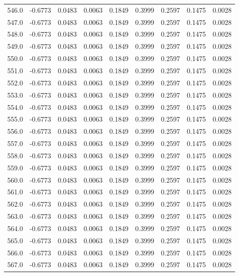 \begin{longtable}{lrrrrrrrr}
546.0 & -0.6773 & 0.0483 & 0.0063 & 0.1849 & 0.3999 & 0.2597 & 0.1475 & 0.0028 \\
547.0 & -0.6773 & 0.0483 & 0.0063 & 0.1849 & 0.3999 & 0.2597 & 0.1475 & 0.0028 \\
548.0 & -0.6773 & 0.0483 & 0.0063 & 0.1849 & 0.3999 & 0.2597 & 0.1475 & 0.0028 \\
549.0 & -0.6773 & 0.0483 & 0.0063 & 0.1849 & 0.3999 & 0.2597 & 0.1475 & 0.0028 \\
550.0 & -0.6773 & 0.0483 & 0.0063 & 0.1849 & 0.3999 & 0.2597 & 0.1475 & 0.0028 \\
551.0 & -0.6773 & 0.0483 & 0.0063 & 0.1849 & 0.3999 & 0.2597 & 0.1475 & 0.0028 \\
552.0 & -0.6773 & 0.0483 & 0.0063 & 0.1849 & 0.3999 & 0.2597 & 0.1475 & 0.0028 \\
553.0 & -0.6773 & 0.0483 & 0.0063 & 0.1849 & 0.3999 & 0.2597 & 0.1475 & 0.0028 \\
554.0 & -0.6773 & 0.0483 & 0.0063 & 0.1849 & 0.3999 & 0.2597 & 0.1475 & 0.0028 \\
555.0 & -0.6773 & 0.0483 & 0.0063 & 0.1849 & 0.3999 & 0.2597 & 0.1475 & 0.0028 \\
556.0 & -0.6773 & 0.0483 & 0.0063 & 0.1849 & 0.3999 & 0.2597 & 0.1475 & 0.0028 \\
557.0 & -0.6773 & 0.0483 & 0.0063 & 0.1849 & 0.3999 & 0.2597 & 0.1475 & 0.0028 \\
558.0 & -0.6773 & 0.0483 & 0.0063 & 0.1849 & 0.3999 & 0.2597 & 0.1475 & 0.0028 \\
559.0 & -0.6773 & 0.0483 & 0.0063 & 0.1849 & 0.3999 & 0.2597 & 0.1475 & 0.0028 \\
560.0 & -0.6773 & 0.0483 & 0.0063 & 0.1849 & 0.3999 & 0.2597 & 0.1475 & 0.0028 \\
561.0 & -0.6773 & 0.0483 & 0.0063 & 0.1849 & 0.3999 & 0.2597 & 0.1475 & 0.0028 \\
562.0 & -0.6773 & 0.0483 & 0.0063 & 0.1849 & 0.3999 & 0.2597 & 0.1475 & 0.0028 \\
563.0 & -0.6773 & 0.0483 & 0.0063 & 0.1849 & 0.3999 & 0.2597 & 0.1475 & 0.0028 \\
564.0 & -0.6773 & 0.0483 & 0.0063 & 0.1849 & 0.3999 & 0.2597 & 0.1475 & 0.0028 \\
565.0 & -0.6773 & 0.0483 & 0.0063 & 0.1849 & 0.3999 & 0.2597 & 0.1475 & 0.0028 \\
566.0 & -0.6773 & 0.0483 & 0.0063 & 0.1849 & 0.3999 & 0.2597 & 0.1475 & 0.0028 \\
567.0 & -0.6773 & 0.0483 & 0.0063 & 0.1849 & 0.3999 & 0.2597 & 0.1475 & 0.0028 \\

\end{longtable}
